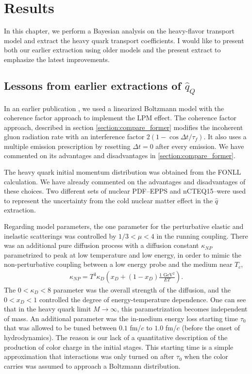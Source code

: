 \chapter{Results}
\label{chapter:results}
In this chapter, we perform a Bayesian analysis on the heavy-flavor transport model and extract the heavy quark transport coefficients.
I would like to present both our earlier extraction using older models and the present extract to emphasize the latest improvements.

\section{Lessons from earlier extractions of $\hat{q}_Q$}
In an earlier publication \cite{Ke:2018tsh}, we used a linearized Boltzmann model with the coherence factor approach to implement the LPM effect.
The coherence factor approach, described in section  \ref{section:compare_former} modifies the incoherent gluon radiation rate with an interference factor $2(1-\cos\Delta t/\tau_f)$. 
It also uses a multiple emission prescription by resetting $\Delta t=0$ after every emission.
We have commented on its advantages and disadvantages in \ref{section:compare_former}.

The heavy quark initial momentum distribution was obtained from the FONLL calculation.
We have already commented on the advantages and disadvantages of these choices.
Two different sets of nuclear PDF--EPPS and nCTEQ15--were used to represent the uncertainty from the cold nuclear matter effect in the $\hat{q}$ extraction.

Regarding model parameters, the one parameter for the perturbative elastic and inelastic scatterings was controlled by $1/3 < \mu < 4$ in the running coupling. 
There was an additional pure diffusion process with a diffusion constant $\kappa_{NP}$ parametrized to peak at low temperature and low energy, in order to mimic the non-perturbative coupling between a low energy probe and the medium near $T_c$,
\begin{eqnarray}
\kappa_{NP} = T^3 \kappa_D \left(x_D + (1-x_D)\frac{1\textrm{ GeV}{}^2}{ET}\right).
\end{eqnarray}
The $0<\kappa_D<8$ parameter was the overall strength of the diffusion, and the $0<x_D<1$ controlled the degree of energy-temperature dependence.
One can see that in the heavy quark limit $M\rightarrow \infty$, this parametrization becomes independent of mass.
An additional parameter was the in-medium energy loss starting time $\tau_0$ that was allowed to be tuned between $0.1$ fm/$c$ to $1.0$ fm/$c$ (before the onset of hydrodynamics).
The reason is our lack of a quantitative description of the production of color charge in the initial stages.
This starting time is a simple approximation that interactions was only turned on after $\tau_0$ when the color carries was assumed to approach a Boltzmann distribution.

